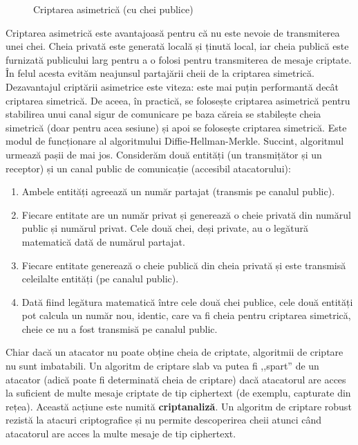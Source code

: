 \begin{figure}[htbp]
  \centering
  \def\svgwidth{\columnwidth}
  
  \caption{Criptarea asimetrică (cu chei publice)}
  \label{fig:sec:asymmetric-encryption}
\end{figure}

Criptarea asimetrică este avantajoasă pentru că nu este nevoie de transmiterea unei chei.
Cheia privată este generată locală și ținută local, iar cheia publică este furnizată publicului larg pentru a o folosi pentru transmiterea de mesaje criptate.
În felul acesta evităm neajunsul partajării cheii de la criptarea simetrică.
Dezavantajul criptării asimetrice este viteza: este mai puțin performantă decât criptarea simetrică.
De aceea, în practică, se folosește criptarea asimetrică pentru stabilirea unui canal sigur de comunicare pe baza căreia se stabilește cheia simetrică (doar pentru acea sesiune) și apoi se folosește criptarea simetrică.
Este modul de funcționare al algoritmului Diffie-Hellman-Merkle.
Succint, algoritmul urmează pașii de mai jos.
Considerăm două entități (un transmițător și un receptor) și un canal public de comunicație (accesibil atacatorului):

\begin{enumerate}
  \item Ambele entități agreează un număr partajat (transmis pe canalul public).
  \item Fiecare entitate are un număr privat și generează o cheie privată din numărul public și numărul privat.
    Cele două chei, deși private, au o legătură matematică dată de numărul partajat.
  \item Fiecare entitate generează o cheie publică din cheia privată și este transmisă celeilalte entități (pe canalul public).
  \item Dată fiind legătura matematică între cele două chei publice, cele două entități pot calcula un număr nou, identic, care va fi cheia pentru criptarea simetrică, cheie ce nu a fost transmisă pe canalul public.
\end{enumerate}

Chiar dacă un atacator nu poate obține cheia de criptate, algoritmii de criptare nu sunt imbatabili.
Un algoritm de criptare slab va putea fi ,,spart'' de un atacator (adică poate fi determinată cheia de criptare) dacă atacatorul are acces la suficient de multe mesaje criptate de tip ciphertext (de exemplu, capturate din rețea).
Această acțiune este numită \textbf{criptanaliză}.
Un algoritm de criptare robust rezistă la atacuri criptografice și nu permite descoperirea cheii atunci când atacatorul are acces la multe mesaje de tip ciphertext.

